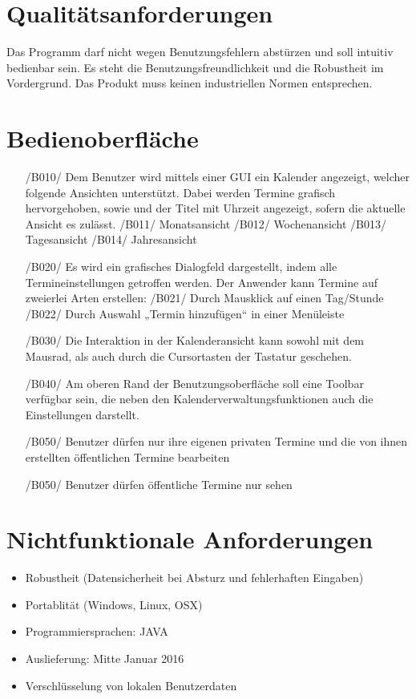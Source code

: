 \documentclass[a4paper]{article}
\begin{document}
  \section{Qualitätsanforderungen}
    Das Programm darf nicht wegen Benutzungsfehlern abstürzen und soll intuitiv bedienbar sein. Es steht die Benutzungsfreundlichkeit und die Robustheit im Vordergrund. Das Produkt muss keinen industriellen Normen entsprechen.

  \section{Bedienoberfläche}
    \begin{itemize}
		  \item[/B010/] Dem Benutzer wird mittels einer GUI ein Kalender angezeigt, welcher
		  folgende Ansichten unterstützt. Dabei werden Termine grafisch hervorgehoben, sowie und der Titel mit Uhrzeit angezeigt, sofern die aktuelle Ansicht es zulässt.
			  \subitem /B011/ Monatsansicht
			  \subitem /B012/ Wochenansicht
			  \subitem /B013/ Tagesansicht
				\subitem /B014/ Jahresansicht
		  \item[/B020/] Es wird ein grafisches Dialogfeld dargestellt, indem alle Termineinstellungen getroffen werden. Der Anwender kann Termine auf zweierlei Arten erstellen:
			  \subitem /B021/ Durch Mausklick auf einen Tag/Stunde
			  \subitem /B022/ Durch Auswahl „Termin hinzufügen“ in einer Menüleiste
		  \item[/B030/] Die Interaktion in der Kalenderansicht kann sowohl mit dem Mausrad,
		  als auch durch die Cursortasten der Tastatur geschehen.
		  \item[/B040/] Am oberen Rand der Benutzungsoberfläche soll eine Toolbar
		  verfügbar sein, die neben den Kalenderverwaltungsfunktionen auch die
		  Einstellungen darstellt.
			\item[/B050/] Benutzer dürfen nur ihre eigenen privaten Termine und die von ihnen erstellten öffentlichen Termine bearbeiten
			\item[/B050/] Benutzer dürfen öffentliche Termine nur sehen
    \end{itemize}

  \section{Nichtfunktionale Anforderungen}
		\begin{itemize}
			\item Robustheit (Datensicherheit bei Absturz und fehlerhaften Eingaben)
			\item Portablität (Windows, Linux, OSX)
			\item Programmiersprachen: JAVA
			\item Auslieferung: Mitte Januar 2016
			\item Verschlüsselung von lokalen Benutzerdaten
		\end{itemize}
\end{document}
